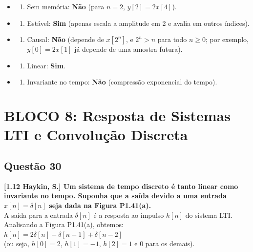\begin{itemize}
\tightlist
\item
  \begin{enumerate}
  \def\labelenumi{(\roman{enumi})}
  \tightlist
  \item
    Sem memória: \textbf{Não} (para \(n=2\), \(y[2] = 2x[4]\)).
  \end{enumerate}
\item
  \begin{enumerate}
  \def\labelenumi{(\roman{enumi})}
  \setcounter{enumi}{1}
  \tightlist
  \item
    Estável: \textbf{Sim} (apenas escala a amplitude em 2 e avalia em outros índices).
  \end{enumerate}
\item
  \begin{enumerate}
  \def\labelenumi{(\roman{enumi})}
  \setcounter{enumi}{2}
  \tightlist
  \item
    Causal: \textbf{Não} (depende de \(x[2^n]\), e \(2^n > n\) para todo \(n \ge 0\); por exemplo, \(y[0] = 2x[1]\) já depende de uma amostra futura).
  \end{enumerate}
\item
  \begin{enumerate}
  \def\labelenumi{(\roman{enumi})}
  \setcounter{enumi}{3}
  \tightlist
  \item
    Linear: \textbf{Sim}.
  \end{enumerate}
\item
  \begin{enumerate}
  \def\labelenumi{(\alph{enumi})}
  \setcounter{enumi}{21}
  \tightlist
  \item
    Invariante no tempo: \textbf{Não} (compressão exponencial do tempo).
  \end{enumerate}
\end{itemize}

\section{BLOCO 8: Resposta de Sistemas LTI e Convolução Discreta}\label{bloco-8-resposta-de-sistemas-lti-e-convoluuxe7uxe3o-discreta}

\subsection{Questão 30}\label{questuxe3o-30}

\textbf{{[}1.12 Haykin, S.{]} Um sistema de tempo discreto é tanto linear como invariante no tempo. Suponha que a saída devido a uma entrada \(x[n] = \delta[n]\) seja dada na Figura P1.41(a).}\\
A saída para a entrada \(\delta[n]\) é a resposta ao impulso \(h[n]\) do sistema LTI. Analisando a Figura P1.41(a), obtemos:\\
\(h[n] = 2\delta[n] - \delta[n-1] + \delta[n-2]\)\\
(ou seja, \(h[0]=2\), \(h[1]=-1\), \(h[2]=1\) e 0 para os demais).


